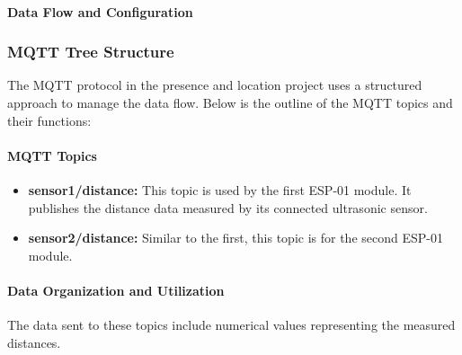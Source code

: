 \documentclass{article}
\begin{document}
\paragraph{Data Flow and Configuration}

\subsubsection{MQTT Tree Structure}
The MQTT protocol in the presence and location project uses a structured approach to manage the data flow. Below is the outline of the MQTT topics and their functions:

\paragraph{MQTT Topics}
\begin{itemize}
    \item \textbf{sensor1/distance:} This topic is used by the first ESP-01 module. It publishes the distance data measured by its connected ultrasonic sensor.
    \item \textbf{sensor2/distance:} Similar to the first, this topic is for the second ESP-01 module.
\end{itemize}

\paragraph{Data Organization and Utilization}
The data sent to these topics include numerical values representing the measured distances. 
\end{document}
